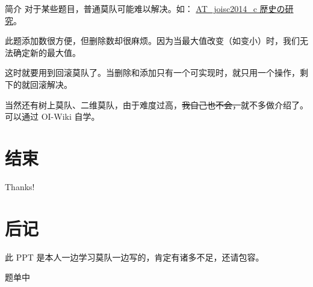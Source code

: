\documentclass[table]{beamer}
\begin{document}
\begin{frame}{简介}
	对于某些题目，普通莫队可能难以解决。如：
	{\color{blue}\href{https://www.luogu.com.cn/problem/AT_joisc2014_c}{AT\_joisc2014\_c 歴史の研究}}。

	此题添加数很方便，但删除数却很麻烦。因为当最大值改变（如变小）时，我们无法确定新的最大值。

	这时就要用到回滚莫队了。当删除和添加只有一个可实现时，就只用一个操作，剩下的就回滚解决。
	\pause

	当然还有树上莫队、二维莫队，由于难度过高，\sout{我自己也不会，}就不多做介绍了。可以通过 OI-Wiki 自学。
\end{frame}

\section{结束}

\begin{frame}
	\begin{center}
		\Huge Thanks!
	\end{center}
\end{frame}

\section{后记}
\begin{frame}
	此 PPT 是本人一边学习莫队一边写的，肯定有诸多不足，还请包容。
	
	题单中
\end{frame}
\end{document}
